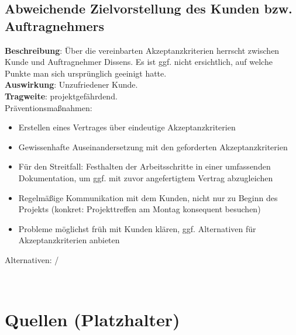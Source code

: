 \documentclass[a4paper, 12pt, titlepage]{scrartcl}
\begin{document}
	\subsection{Abweichende Zielvorstellung des Kunden bzw. Auftragnehmers}
		\textbf{Beschreibung}: \"Uber die vereinbarten Akzeptanzkriterien herrscht zwischen Kunde und Auftragnehmer Dissens. Es ist ggf. nicht ersichtlich, auf welche Punkte man sich urspr\"unglich geeinigt hatte.\\
		\textbf{Auswirkung}: Unzufriedener Kunde.\\
		\textbf{Tragweite}: projektgef\"ahrdend.\\
		Pr\"aventionsma\ss nahmen:
			\begin{itemize}
				\item Erstellen eines Vertrages \"uber eindeutige Akzeptanzkriterien
				\item Gewissenhafte Auseinandersetzung mit den geforderten Akzeptanzkriterien
				\item F\"ur den Streitfall: Festhalten der Arbeitsschritte in einer umfassenden Dokumentation, um ggf. mit zuvor angefertigtem Vertrag abzugleichen
				\item Regelm\"a\ss ige Kommunikation mit dem Kunden, nicht nur zu Beginn des Projekts (konkret: Projekttreffen am Montag konsequent besuchen)
				\item Probleme m\"oglichst fr\"uh mit Kunden kl\"aren, ggf. Alternativen f\"ur Akzeptanzkriterien anbieten
			\end{itemize}
		Alternativen: /

\

\section{Quellen (Platzhalter)}
\end{document}
